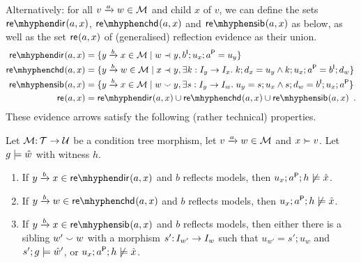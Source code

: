 Alternatively: for all $\trip vaw\in\cM$ and child $x$ of $v$, we can define the sets $\redir{a,x}$, $\rechd{a,x}$ and $\resib{a,x}$ as below, as well as the set $\mathsf{re}_{}(a,x)$ of (generalised) reflection evidence as their union.
%
\begin{align*}
\redir{a,x} ={} & \gensetof{\trip ybx\in \cM}{w\parentof y, b\I;u_x;a\P=u_y} \\
\rechd{a,x} ={} & \gensetof{\trip ybw\in \cM}{x\parentof y, \exists k:I_y\to I_x\st k;d_x=u_y\wedge k;u_x;a\P=b\I;d_w} \\
\resib{a,x} ={} & \gensetof{\trip ybx\in \cM}{w\sibling y, \exists s:I_y\to I_w\st u_y=s;u_x \wedge s;d_w=b\I;u_x;a\P} \\
\re{a,x} ={} & \redir{a,x}\cup \rechd{a,x} \cup \resib{a,x} \enspace.
\end{align*}
%
These evidence arrows satisfy the following (rather technical) properties.
%
\begin{lemma}\label{lem:evidence}
Let  ${\mathcal{M}}{:}\, {\mathcal{T}}\rightarrow{\mathcal{U}}$ be a condition tree morphism, let $\trip vaw\in\cM$ and $x\childof v$. Let $g\models \hat w$ with witness $h$.
\begin{enumerate}[topsep=\itemsep]
\item\label{re-dir} If $\trip ybx\in \redir{a,x}$ and $b$ reflects models, then $u_x;a^{\mathsf P};h\not\models \hat x$.
\item\label{re-chd} If $\trip ybw\in \rechd{a,x}$ and $b$ reflects models, then $u_x;a^{\mathsf P};h\not\models \hat x$.
\item\label{re-sib} If $\trip ybx\in \resib{a,x}$ and $b$ reflects models, then either there is a sibling $w'\smallsmile w$ with a morphism $s'{:}\, I_{w'}\rightarrow I_w$ such that $u_{w'}=s';u_w$ and $s';g\models \hat w'$, or $u_x;a^{\mathsf P};h\not\models \hat x$.
\end{enumerate}
\end{lemma}
%

